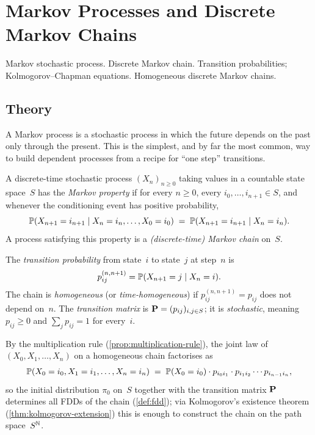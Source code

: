 
\section{Markov Processes and Discrete Markov Chains}
\label{sec:1.2.09-markov-chains}

\begin{ticket}
Markov stochastic process. Discrete Markov chain. Transition probabilities; Kolmogorov–Chapman equations. Homogeneous discrete Markov chains.
\end{ticket}

\subsection*{Theory}

A Markov process is a stochastic process in which the future depends
on the past only through the present. This is the simplest, and by
far the most common, way to build dependent processes from a recipe
for ``one step'' transitions.

\begin{definition}
\label{def:markov-property}
A discrete-time stochastic process $(X_n)_{n \geq 0}$ taking values
in a countable state space~$S$ has the \emph{Markov property} if for
every $n \geq 0$, every $i_0, \dots, i_{n+1} \in S$, and whenever
the conditioning event has positive probability,
\[
  \mathbb{P}(X_{n+1} = i_{n+1} \mid X_n = i_n, \dots, X_0 = i_0) \;=\; \mathbb{P}(X_{n+1} = i_{n+1} \mid X_n = i_n).
\]
A process satisfying this property is a \emph{(discrete-time) Markov
chain} on~$S$.
\end{definition}

\begin{definition}
\label{def:transition-probabilities}
The \emph{transition probability} from state~$i$ to state~$j$ at
step~$n$ is
\[
  p_{ij}^{(n,n+1)} = \mathbb{P}(X_{n+1} = j \mid X_n = i).
\]
The chain is \emph{homogeneous} (or \emph{time-homogeneous}) if
$p_{ij}^{(n,n+1)} = p_{ij}$ does not depend on~$n$. The
\emph{transition matrix} is $\mathbf{P} = (p_{ij})_{i, j \in S}$; it is
\emph{stochastic}, meaning $p_{ij} \geq 0$ and $\sum_j p_{ij} = 1$
for every~$i$.
\end{definition}

By the multiplication rule (\cref{prop:multiplication-rule}), the
joint law of $(X_0, X_1, \dots, X_n)$ on a homogeneous chain
factorises as
\[
  \mathbb{P}(X_0 = i_0, X_1 = i_1, \dots, X_n = i_n) \;=\; \mathbb{P}(X_0 = i_0) \cdot p_{i_0 i_1} \cdot p_{i_1 i_2} \cdots p_{i_{n-1} i_n},
\]
so the initial distribution $\pi_0$ on~$S$ together with the
transition matrix $\mathbf{P}$ determines all FDDs of the chain
(\cref{def:fdd}); via Kolmogorov's existence theorem
(\cref{thm:kolmogorov-extension}) this is enough to construct the
chain on the path space~$S^{\mathbb{N}}$.

